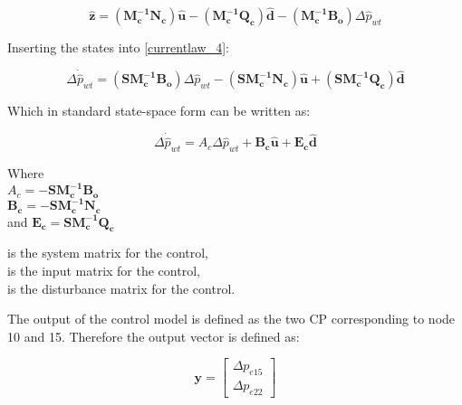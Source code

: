  \begin{equation}
 \bm{\hat{z}} =  (\bm{M_c^{-1}}\bm{N_c}) \bm{\hat{u}} - (\bm{M_c^{-1}}\bm{Q_c}) \bm{\hat{d}} - (\bm{M_c^{-1}}\bm{B_o}) \Delta \hat{p}_{wt}    
 \label{statespace_control_sys_state}
\end{equation}

Inserting the states into \eqref{currentlaw_4}:

 \begin{equation}
\Delta \dot{\hat{p}}_{wt} = (\bm{S}\bm{M_c^{-1}}\bm{B_o}) \Delta \hat{p}_{wt}  - (\bm{S}\bm{M_c^{-1}}\bm{N_c}) \bm{\hat{u}} + (\bm{S}\bm{M_c^{-1}}\bm{Q_c}) \bm{\hat{d}} 
 \label{statespace_control_sys_state_1}
\end{equation}

Which in standard state-space form can be written as: 

 \begin{equation}
\Delta \dot{\hat{p}}_{wt} = A_c \Delta \hat{p}_{wt}  + \bm{B_c} \bm{\hat{u}} + \bm{E_c} \bm{\hat{d}} 
 \label{statespace_control_sys_state_2}
\end{equation}

\begin{minipage}[t]{0.40\textwidth}
Where\\
\hspace*{8mm} $A_c = -\bm{S}\bm{M_c^{-1}}\bm{B_o} $ \\
\hspace*{8mm} $\bm{B_c} = -\bm{S}\bm{M_c^{-1}}\bm{N_c} $ \\
and \hspace*{0.7mm} $\bm{E_c} = \bm{S}\bm{M_c^{-1}}\bm{Q_c} $
\end{minipage}
\begin{minipage}[t]{0.48\textwidth}
\vspace*{2mm}
is the system matrix for the control, \\
is the input matrix for the control, \\
is the disturbance matrix for the control.
\end{minipage} 

The output of the control model is defined as the two CP corresponding to node 10 and 15. Therefore the output vector is defined as: 

\begin{equation}
\bm{y} =
\begin{bmatrix} 
\Delta p_{e15} \\
\Delta p_{e22} 
\label{outputvector_control}
\end{bmatrix} 
\end{equation}


